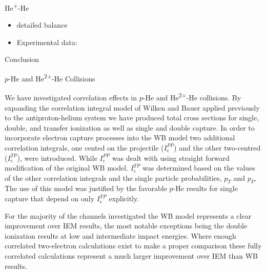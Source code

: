 \documentclass[letterpaper, 11 pt]{report}
\begin{document}
\begin{chapter}{\texorpdfstring{He\textsuperscript{+}}{He+}-He \label{chap:hep-he}}

   \begin{itemize}
      
      \item detailed balance \cite[p. 143--152]{scattering}

      \item Experimental data:~\cite{DT-88, Dub-89, FTFHLP-95, SSMSM-11}

   \end{itemize}

\end{chapter}

\begin{chapter}{Conclusion \label{chap:con}}

   \begin{section}{\texorpdfstring{$p$}{p}-He and \texorpdfstring{He\textsuperscript{2+}}{He2+}-He
                   Collisions \label{sec:con-phe2p-he}}

      We have investigated correlation effects in $p$-He and He\textsuperscript{2+}-He collisions. By
      expanding the correlation integral model of Wilken and Bauer \cite{wb} applied previously to the
      antiproton-helium system \cite{pbarhe} we have produced total cross sections for single, double,
      and transfer ionization as well as single and double capture. In order to incorporate electron
      capture processes into the WB model two additional correlation integrals, one cented on the
      projectile ($I^{PP}_\mathrm{c}$) and the other two-centred ($I^{TP}_\mathrm{c}$), were
      introduced. While $I^{PP}_\mathrm{c}$ was dealt with using straight forward modification of the
      original WB model. $I^{TP}_\mathrm{c}$ was determined based on the values of the other correlation
      integrals and the single particle probabilities, $p_T$ and $p_P$. The use of this model was
      justified by the favorable $p$-He results for single capture that depend on only
      $I^{TP}_\mathrm{c}$ explicitly.

      For the majority of the channels investigated the WB model represents a clear improvement over IEM 
      results, the most notable exceptions being the double ionization results at low and intermediate
      impact energies. Where enough correlated two-electron calculations exist to make a proper
      comparison these fully correlated calculations represent a much larger improvement over IEM than
      WB results. 
  

\end{section}
\end{chapter}
\end{document}
